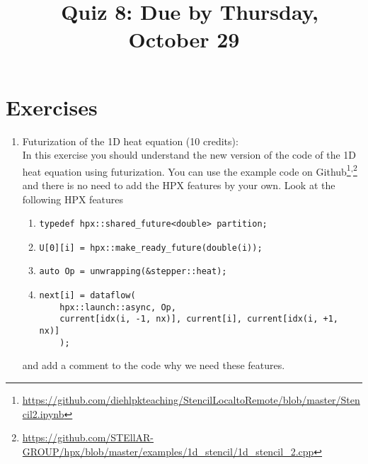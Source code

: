 \documentclass[11pt]{article}
\begin{document}
\title{\coursename~Quiz 8: Due by Thursday, October 29}
\date{}
\maketitle

\medskip


\section*{Exercises}

\begin{enumerate}
\item Futurization of the 1D heat equation (10 credits): \\
In this exercise you should understand the new version of the code of the 1D heat equation using futurization. You can use the example code on Github\footnote{\url{https://github.com/diehlpkteaching/StencilLocaltoRemote/blob/master/Stencil2.ipynb}}\textsuperscript{,}\footnote{\url{https://github.com/STEllAR-GROUP/hpx/blob/master/examples/1d_stencil/1d_stencil_2.cpp}} and there is no need to add the HPX features by your own. Look at the following HPX features
\begin{enumerate}
\item \lstinline|typedef hpx::shared_future<double> partition;|
\item \lstinline|U[0][i] = hpx::make_ready_future(double(i));|
\item \lstinline|auto Op = unwrapping(&stepper::heat);|
\item \begin{lstlisting}
next[i] = dataflow(
	hpx::launch::async, Op,
	current[idx(i, -1, nx)], current[i], current[idx(i, +1, nx)]
	);
\end{lstlisting}
\end{enumerate}
and add a comment to the code why we need these features.


\end{enumerate}
\doclicenseThis 
\end{document}

